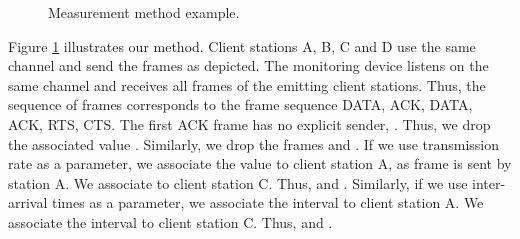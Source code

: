 \documentclass[10pt, conference, compsocconf, letterpaper]{IEEEtran}
\begin{document}
\begin{figure}
\begin{center}
\caption{Measurement method example.}
\label{fig:histogram}
\end{center}
\end{figure}

Figure \ref{fig:histogram} illustrates our method. Client stations A, B, C and D use the same channel and send the frames as depicted. The monitoring device listens on the same channel and receives all frames of the emitting client stations. Thus, the sequence of frames  corresponds to the frame sequence DATA, ACK, DATA, ACK, RTS, CTS.
The first ACK frame  has no explicit sender, . Thus, we drop the associated value . 
Similarly, we drop the frames  and .
If we use transmission rate as a parameter,  we associate the value  to client station A, as frame  is sent by station A.
We associate  to client station C. 
Thus,  and .
Similarly, if we use inter-arrival times as a parameter, we associate the interval  to client station A.
We associate the interval  to client station C. 
Thus,  and .
\end{document}
